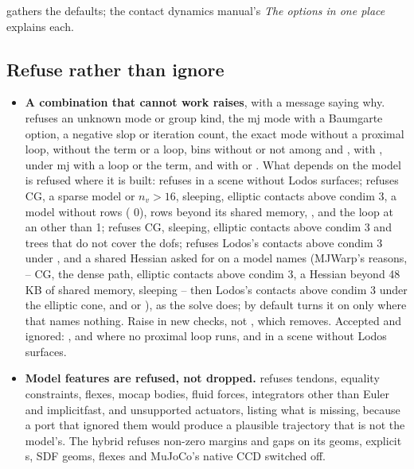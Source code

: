  gathers the defaults; the contact dynamics manual's \emph{The options in one place} explains each.

\subsection{Refuse rather than ignore}\label{sec:refuse}

\begin{itemize}
\item \textbf{A combination that cannot work raises}, with a message saying why.  refuses an unknown mode or group kind, the mj mode with a Baumgarte option, a negative slop or iteration count, the exact mode without a proximal loop,  without the term or a loop, bins without  or not among  and ,  with ,  under mj with a loop or the term, and  with  or . What depends on the model is refused where it is built:  refuses  in a scene without Lodos surfaces;  refuses CG, a sparse model or $n_v > 16$, sleeping, elliptic contacts above condim 3, a model without rows ( 0), rows beyond its shared memory, , and the loop at an  other than 1;  refuses CG, sleeping, elliptic contacts above condim 3 and trees that do not cover the dofs;  refuses Lodos's contacts above condim 3 under , and a shared Hessian asked for on a model  names (MJWarp's reasons,  -- CG, the dense path, elliptic contacts above condim 3, a Hessian beyond 48\,KB of shared memory, sleeping -- then Lodos's contacts above condim 3 under the elliptic cone, and  or ), as the solve does; by default  turns it on only where that names nothing. Raise  in new checks, not , which  removes. Accepted and ignored: ,  and  where no proximal loop runs, and  in a scene without Lodos surfaces.
\item \textbf{Model features are refused, not dropped.}  refuses tendons, equality constraints, flexes, mocap bodies, fluid forces, integrators other than Euler and implicitfast, and unsupported actuators, listing what is missing, because a port that ignored them would produce a plausible trajectory that is not the model's. The hybrid refuses non-zero margins and gaps on its geoms, explicit s, SDF geoms, flexes and MuJoCo's native CCD switched off.

\end{itemize}
